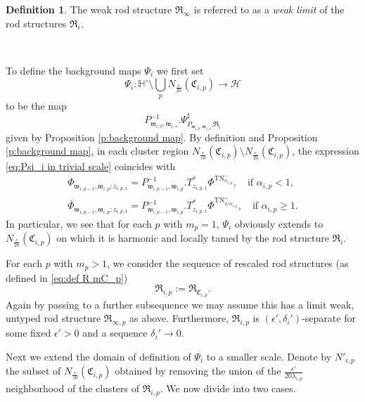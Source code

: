 \documentclass[a4paper,11pt]{amsart}
\theoremstyle{definition}
\newtheorem{definition}[theorem]{Definition}
\numberwithin{equation}{section}
\newcommand{\mw} {\mathfrak w}
\newcommand{\mR} {\mathfrak R}
\newcommand{\mC} {\mathfrak C}
\DeclareMathOperator{\TN}{TN}
\begin{document}
\begin{definition}
    The weak rod structure $\mR_\infty$ is referred to as a \emph{weak limit} of the rod structures $\mR_i$.
\end{definition}


\ 

 
To define the background maps $\Psi_i$ we first set $$\Psi_{i}: \mathbb H^\circ\setminus \bigcup_{p}N_{\frac{\epsilon}{20}}(\mC_{i,p})\rightarrow \mathcal H$$ 
to be  the map 
\begin{equation}\label{eq:Psi_i in trivial scale}
    P_{\mw_{i,0},\mw_{i,s}}^{-1}.\Psi_{P_{\mw_{i,0},\mw_{i,s}}.\mR_i}^\sharp
\end{equation} 
given by Proposition \ref{p:background map}. By definition and Proposition \ref{p:background map}, in each cluster region $N_{\frac{\epsilon}{10}}(\mC_{i,p})\setminus N_{\frac{\epsilon}{20}}(\mC_{i,p})$, the expression \eqref{eq:Psi_i in trivial scale} coincides with
\begin{equation}\label{eq:Psi_i near the cluster region}
    \begin{aligned}
        \Phi_{\mw_{i,p-1},\mw_{i,p};z_{i,p,1}}=P_{\mw_{i,p-1},\mw_{i,p}}^{-1}. T_{z_{i,p,1}}^*\Phi^{\TN^-_{\alpha_{i, p}}},\quad \text{if }\alpha_{i, p}<1,\\
        \overline{\Phi}_{\mw_{i,p-1},\mw_{i,p};z_{i,p,1}}=P_{\mw_{i,p-1},\mw_{i,p}}^{-1}.T_{z_{i,p,1}}^*\Phi^{\TN^+_{4/\alpha_{i, p}}},\quad \text{if }\alpha_{i, p}\geq1.
    \end{aligned}
\end{equation}
In particular, we see that for each $p$ with $m_p=1$, $\Psi_{i}$ obviously extends to  $N_{\frac{\epsilon}{20}}(\mC_{i,p})$ on which it is harmonic and locally tamed by the rod structure $\mR_i$. 

For each $p$ with $m_p>1$,  we consider the sequence of rescaled rod structures (as defined in \eqref{eq:def R mC_p}) $$\mR_{i, p}:=\mR_{\mC_{i, p}}.$$   Again by passing to a further subsequence we may assume this has a limit weak, untyped rod structure $\mR_{\infty, p}$ as above. Furthermore,  \( \mathfrak{R}_{i,p} \) is \( (\epsilon', \delta_i') \)-separate for some fixed \( \epsilon' > 0 \) and a sequence \( \delta_i' \to 0 \).    

Next we extend the domain of definition of $\Psi_i$ to a smaller scale.  Denote by $N'_{i, p}$ the subset of  $N_{\frac{\epsilon}{10}}(\mC_{i, p})$ obtained by removing the union of the $\frac{\epsilon'}{20\lambda_{i, p}}$ neighborhood of the clusters of $\mR_{i, p}$. We now divide into two cases.
\end{document}

